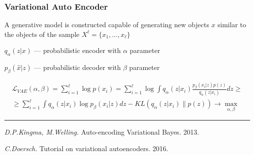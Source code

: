 \documentclass[fullscreen=true, bookmarks=true, hyperref={pdfencoding=unicode}]{beamer}
\begin{document}

\begin{frame}
  \frametitle{Variational Auto Encoder}

  A generative model is constructed capable of generating new objects $x$ similar to the objects of the sample $X^\ell = \{x_1,\dots,x_\ell \}$

   $q_\alpha(z|x)$ — probabilistic encoder with $\alpha$ parameter

   $p_\beta(\hat x|z)$ — probabilistic decoder with $\beta$ parameter

    \begin{align*}
    \mathscr{L}_{VAE}(\alpha, \beta) = \sum\limits_{i=1}^\ell \log p(x_i) = \sum\limits_{i=1}^\ell \log \int q_{\alpha} (z | x_i) \frac{p_{\beta}(x_i|z) p(z)}{q_{\alpha} (z | x_i)} dz \geq \\
     \geq \sum\limits_{i=1}^\ell \int q_\alpha(z|x_i) \log p_\beta(x_i|z)dz - KL(q_\alpha(z|x_i)\| p( z)) \to \max\limits_{\alpha, \beta}
    \end{align*}

  \vspace{0.5cm}
  \noindent\rule{8cm}{0.4pt}

  {\footnotesize
  {\it D.P.Kingma, M.Welling.} Auto-encoding Variational Bayes. 2013.

  {\it C.Doersch.} Tutorial on variational autoencoders. 2016.}
\end{frame}


\end{document}

